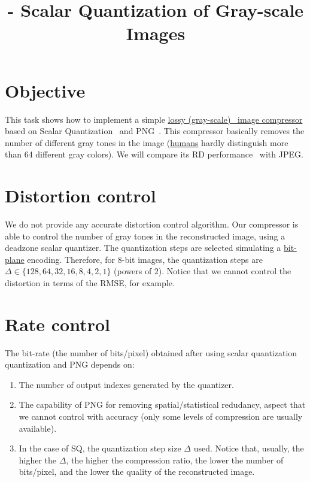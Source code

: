 

\title{\SM{} - Scalar Quantization of Gray-scale Images}

\maketitle
\tableofcontents

\section{Objective}
This task shows how to implement a simple
\href{https://en.wikipedia.org/wiki/Lossy_compression}{lossy
  (gray-scale)~\cite{vruiz__image_IO} image compressor} based on
Scalar
Quantization~\cite{vruiz__scalar_quantization,sayood2017introduction,vetterli2014foundations}
and PNG~\cite{vruiz__PNG}. This compressor basically removes the
number of different gray tones in the image
(\href{https://en.wikipedia.org/wiki/Visual_system}{humans} hardly
distinguish more than 64 different gray colors). We will compare its
RD performance~\cite{vruiz__information_theory} with JPEG.

\section{Distortion control}
We do not provide any accurate distortion control algorithm. Our
compressor is able to control the number of gray tones in the
reconstructed image, using a deadzone scalar quantizer. The
quantization steps are selected simulating a
\href{https://en.wikipedia.org/wiki/Bit_plane}{bit-plane}
encoding. Therefore, for 8-bit images, the quantization steps are
$\Delta\in\{128, 64, 32, 16, 8, 4, 2, 1\}$ (powers of $2$). Notice
that we cannot control the distortion in terms of the RMSE, for
example.

\section{Rate control}
The bit-rate (the number of bits/pixel) obtained after using
scalar quantization quantization and PNG depends on:
\begin{enumerate}
\item The number of output indexes generated by the quantizer.
\item The capability of PNG for removing spatial/statistical
  redudancy, aspect that we cannot control with accuracy (only some
  levels of compression are usually available).
\item In the case of SQ, the quantization step size $\Delta$
  used. Notice that, usually, the higher the $\Delta$, the higher the
  compression ratio, the lower the number of bits/pixel, and the lower
  the quality of the reconstructed image.
\end{enumerate}

